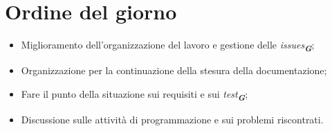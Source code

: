 

\section{Ordine del giorno}

\begin{itemize}
    \item Miglioramento dell'organizzazione del lavoro e gestione delle \emph{issues}\textsubscript{\textit{\textbf{G}}};
    \item Organizzazione per la continuazione della stesura della documentazione;
    \item Fare il punto della situazione sui requisiti e sui \emph{test}\textsubscript{\textit{\textbf{G}}};
    \item Discussione sulle attività di programmazione e sui problemi riscontrati.
\end{itemize}